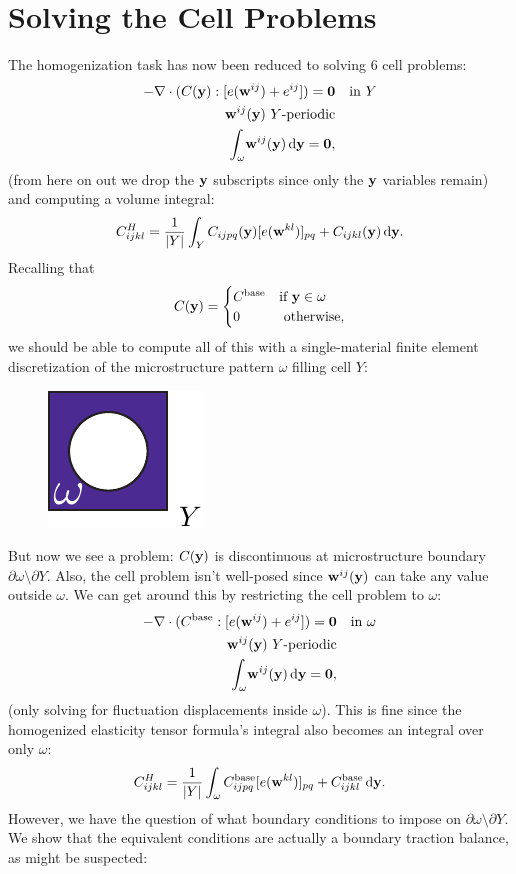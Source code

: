 \documentclass[10pt]{article}
\begin{document}
\section{Solving the Cell Problems}
The homogenization task has now been reduced to solving 6 cell problems:
\begin{align*}
    -\nabla \cdot (C({\bf y}) : [e({\bf w}^{ij}) + e^{ij}]) = {\bf 0} & \quad \text{in } Y \\
    {\bf w}^{ij}({\bf y})\ Y \text{-periodic} & \\
    \int_\omega \! {\bf w}^{ij}({\bf y})  \, \mathrm{d} {\bf y} =  {\bf 0}, 
\end{align*}
(from here on out we drop the ${\bf y}$ subscripts since only the ${\bf y}$
variables remain) and computing a volume integral:
$$
C^H_{ijkl} = \frac{1}{|Y|} \int_Y C_{ijpq}({\bf y}) [e({\bf w}^{kl})]_{pq} + C_{ijkl}({\bf y}) \, \mathrm{d} {\bf y}.
$$
Recalling that 
$$
C ({\bf y}) = \begin{cases} C^\text{base} & \text{if } {\bf y} \in \omega \\
                                 0 & \text{ otherwise,} \end{cases}
$$
we should be able to compute all of this with a single-material finite element discretization
of the microstructure pattern $\omega$ filling cell $Y$:
\begin{figure}[H]
    \centering
    \includegraphics[width=.16\textwidth]{Images/cell.pdf}
\end{figure}
But now we see a problem: $C({\bf y})$ is discontinuous at microstructure boundary $\partial \omega \setminus \partial Y$. Also,
the cell problem isn't well-posed since ${\bf w}^{ij}({\bf y})$ can take any
value outside $\omega$. We can get around this by restricting the cell problem to $\omega$:
\begin{align*}
    -\nabla \cdot (C^\text{base} : [e({\bf w}^{ij}) + e^{ij}]) = {\bf 0} & \quad \text{in } \omega \\
    {\bf w}^{ij}({\bf y})\ Y \text{-periodic} & \\
    \int_\omega \! {\bf w}^{ij}({\bf y})  \, \mathrm{d} {\bf y} =  {\bf 0}, 
\end{align*}
(only solving for fluctuation displacements inside $\omega$). This is fine
since the homogenized elasticity tensor formula's integral also becomes an
integral over only $\omega$:
$$
C^H_{ijkl} = \frac{1}{|Y|} \int_\omega C_{ijpq}^\text{base} [e({\bf w}^{kl})]_{pq} + C_{ijkl}^\text{base} \, \mathrm{d} {\bf y}.
$$
However, we have the question of what boundary conditions to impose on
$\partial \omega \setminus \partial Y$. We show that the equivalent conditions
are actually a boundary traction balance, as might be suspected:
\end{document}
